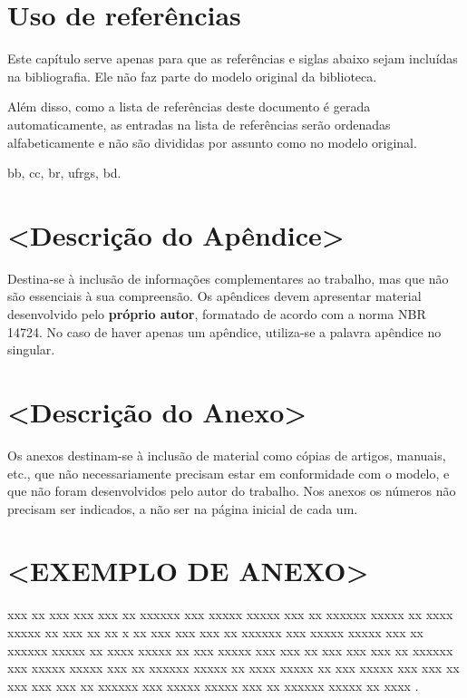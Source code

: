 \documentclass[
	oneside,
	english,brazil,
	mestrado,ppgc]{infufrgs}
\begin{document}
\chapter{Uso de referências}
Este capítulo serve apenas para que as referências e siglas abaixo sejam
incluídas na bibliografia.  Ele não faz parte do modelo original da biblioteca.

Além disso, como a lista de referências deste documento é gerada
automaticamente, as entradas na lista de referências serão ordenadas
alfabeticamente e não são divididas por assunto como no modelo original.


\ac{bb}, \ac{cc}, \ac{br}, \ac{ufrgs}, \ac{bd}.



\apendices
\chapter{<Descrição do Apêndice>}
Destina-se à inclusão de informações complementares ao trabalho, mas que não
são essenciais à sua compreensão. Os apêndices devem apresentar material
desenvolvido pelo \textbf{próprio autor}, formatado de acordo com a norma NBR
14724. No caso de haver apenas um apêndice, utiliza-se a palavra apêndice no
singular.

\anexos
\chapter{<Descrição do Anexo>}
Os anexos destinam-se à inclusão de material como cópias de artigos, manuais,
etc., que não necessariamente precisam estar em conformidade com o modelo, e
que não foram desenvolvidos pelo autor do trabalho. Nos anexos os números não
precisam ser indicados, a não ser na página inicial de cada um.

\chapter{<EXEMPLO DE ANEXO>}
xxx xx xxx xxx xxx xx xxxxxx xxx xxxxx xxxxx xxx xx xxxxxx xxxxx xx xxxx xxxxx
xx xxx xx xx x xx xxx xxx xxx xx xxxxxx xxx xxxxx xxxxx xxx xx xxxxxx xxxxx xx
xxxx xxxxx xx xxx xxxxx xxx xxx xx xxx xxx xxx xx xxxxxx xxx xxxxx xxxxx xxx xx
xxxxxx xxxxx xx xxxx xxxxx xx xxx xxxxx xxx xxx xx xxx xxx xxx xx xxxxxx xxx
xxxxx xxxxx xxx xx xxxxxx xxxxx xx xxxx .
\end{document}
